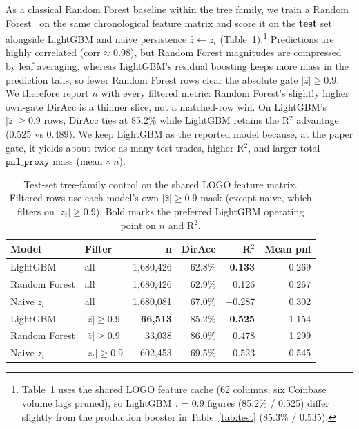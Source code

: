 As a classical Random Forest baseline within the tree family, we train a Random Forest~\cite{breiman2001random} on the same chronological feature matrix and score it on the \textbf{test} set alongside LightGBM and naive persistence $\hat{z}\leftarrow z_t$ (Table~\ref{tab:rf_test}).\footnote{Table~\ref{tab:rf_test} uses the shared LOGO feature cache (62 columns; six Coinbase volume lags pruned), so LightGBM $\tau{=}0.9$ figures (85.2\% / 0.525) differ slightly from the production booster in Table~\ref{tab:test} (85.3\% / 0.535).} Predictions are highly correlated ($\mathrm{corr}\approx 0.98$), but Random Forest magnitudes are compressed by leaf averaging, whereas LightGBM's residual boosting keeps more mass in the prediction tails, so fewer Random Forest rows clear the absolute gate $|\hat{z}|\geq 0.9$. We therefore report $n$ with every filtered metric: Random Forest's slightly higher own-gate DirAcc is a thinner slice, not a matched-row win. On LightGBM's $|\hat{z}|\geq 0.9$ rows, DirAcc ties at 85.2\% while LightGBM retains the R$^2$ advantage (0.525 vs 0.489). We keep LightGBM as the reported model because, at the paper gate, it yields about twice as many test trades, higher R$^2$, and larger total $\texttt{pnl\_proxy}$ mass ($\mathrm{mean}\times n$).

\begin{table}[h]
\caption{Test-set tree-family control on the shared LOGO feature matrix. Filtered rows use each model's own $|\hat{z}|\geq 0.9$ mask (except naive, which filters on $|z_t|\geq 0.9$). Bold marks the preferred LightGBM operating point on $n$ and R$^2$.}
\label{tab:rf_test}
\small
\begin{tabular}{llrrrr}
\toprule
\textbf{Model} & \textbf{Filter} & \textbf{n} & \textbf{DirAcc} & \textbf{R$^2$} & \textbf{Mean pnl} \\
\midrule
LightGBM & all & 1{,}680{,}426 & 62.8\% & \textbf{0.133} & 0.269 \\
Random Forest & all & 1{,}680{,}426 & 62.9\% & 0.126 & 0.267 \\
Naive $z_t$ & all & 1{,}680{,}081 & 67.0\% & $-$0.287 & 0.302 \\
\midrule
LightGBM & $|\hat{z}|\geq 0.9$ & \textbf{66{,}513} & 85.2\% & \textbf{0.525} & 1.154 \\
Random Forest & $|\hat{z}|\geq 0.9$ & 33{,}038 & 86.0\% & 0.478 & 1.299 \\
Naive $z_t$ & $|z_t|\geq 0.9$ & 602{,}453 & 69.5\% & $-$0.523 & 0.545 \\
\bottomrule
\end{tabular}
\end{table}

